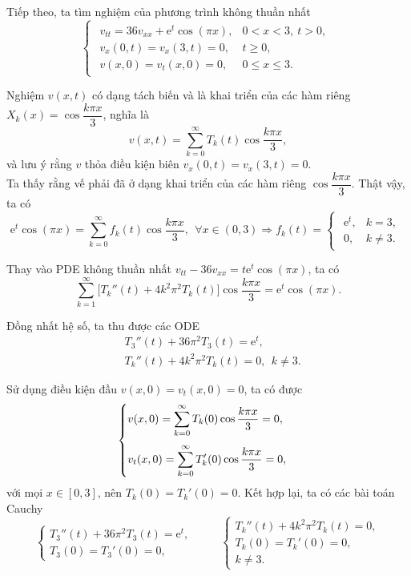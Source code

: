 \documentclass[10pt, a4paper]{article}
\begin{document}
	Tiếp theo, ta tìm nghiệm của phương trình không thuần nhất $$\begin{cases}
		\begin{array}{ll}
			v_{tt}=36v_{xx}+\mathrm e^t\cos(\pi x), & 0<x<3,~t>0,\\
			v_x(0,t)=v_x(3,t)=0, & t\ge0,\\
			v(x,0)=v_t(x,0)=0, & 0\le x\le 3.
		\end{array}
	\end{cases}$$
	
	Nghiệm $v(x,t)$ có dạng tách biến và là khai triển của các hàm riêng $X_k(x)=\cos\dfrac{k\pi x}{3}$, nghĩa là $$v(x,t)=\sum_{k=0}^\infty T_k(t)\cos\frac{k\pi x}{3},$$
	và lưu ý rằng $v$ thỏa điều kiện biên $v_x(0,t)=v_x(3,t)=0$.\\
	
	Ta thấy rằng vế phải đã ở dạng khai triển của các hàm riêng $\cos\dfrac{k\pi x}{3}$. Thật vậy, ta có $$\mathrm e^t\cos(\pi x)=\sum_{k=0}^\infty f_k(t)\cos\dfrac{k\pi x}{3},~~\forall x\in(0,3)\Rightarrow f_k(t)=\begin{cases}
		\begin{array}{ll}
			\mathrm e^{t}, & k=3, \\
			0, & k\ne3.
		\end{array}
	\end{cases}$$
	
	Thay vào PDE không thuần nhất $v_{tt}-36v_{xx}=t\mathrm e^t\cos(\pi x)$, ta có $$\sum_{k=1}^\infty\big[T_k''(t)+4k^2\pi^2T_k(t)\big]\cos\frac{k\pi x}{3}=\mathrm e^{t}\cos(\pi x).$$
	
	Đồng nhất hệ số, ta thu được các ODE \begin{align*}
		&T_3''(t)+36\pi^2T_3(t)=\mathrm e^{t},\\
		&T_k''(t)+4k^2\pi^2T_k(t)=0,~~k\ne3.
	\end{align*}
	
	Sử dụng điều kiện đầu $v(x,0)=v_t(x,0)=0$, ta có được $$\begin{cases}
		v(x,0)=\displaystyle\sum_{k=0}^\infty T_k(0)\cos\frac{k\pi x}{3}=0,\\
		\noalign{\vskip7pt}
		v_t(x,0)=\displaystyle\sum_{k=0}^\infty T_k'(0)\cos\frac{k\pi x}{3}=0,
	\end{cases}$$
	với mọi $x\in[0,3]$, nên $T_k(0)=T_k'(0)=0$. Kết hợp lại, ta có các bài toán Cauchy $$\begin{cases}
		T_3''(t)+36\pi^2T_3(t)=\mathrm e^{t},\\
		T_3(0)=T_3'(0)=0,
	\end{cases}\hspace{1cm}\begin{cases}
		T_k''(t)+4k^2\pi^2T_k(t)=0,\\
		T_k(0)=T_k'(0)=0,\\
		k\ne3.
	\end{cases}$$
	
\end{document}
